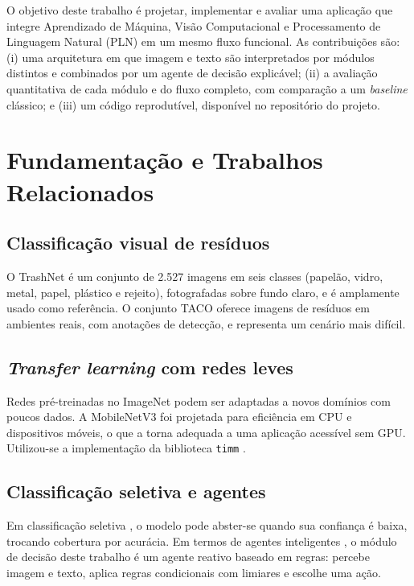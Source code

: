 \documentclass[conference]{IEEEtran}
\begin{document}
O objetivo deste trabalho \'e projetar, implementar e avaliar uma aplica\c{c}\~ao que integre Aprendizado de M\'aquina, Vis\~ao Computacional e Processamento de Linguagem Natural (PLN) em um mesmo fluxo funcional. As contribui\c{c}\~oes s\~ao: (i) uma arquitetura em que imagem e texto s\~ao interpretados por m\'odulos distintos e combinados por um agente de decis\~ao explic\'avel; (ii) a avalia\c{c}\~ao quantitativa de cada m\'odulo e do fluxo completo, com compara\c{c}\~ao a um \emph{baseline} cl\'assico; e (iii) um c\'odigo reprodut\'ivel, dispon\'ivel no reposit\'orio do projeto.

\section{Fundamenta\c{c}\~ao e Trabalhos Relacionados}
\subsection{Classifica\c{c}\~ao visual de res\'iduos}
O TrashNet \cite{yang2016trashnet} \'e um conjunto de 2.527 imagens em seis classes (papel\~ao, vidro, metal, papel, pl\'astico e rejeito), fotografadas sobre fundo claro, e \'e amplamente usado como refer\^encia. O conjunto TACO \cite{proenca2020taco} oferece imagens de res\'iduos em ambientes reais, com anota\c{c}\~oes de detec\c{c}\~ao, e representa um cen\'ario mais dif\'icil.

\subsection{\emph{Transfer learning} com redes leves}
Redes pr\'e-treinadas no ImageNet \cite{deng2009imagenet} podem ser adaptadas a novos dom\'inios com poucos dados. A MobileNetV3 \cite{howard2019mobilenetv3} foi projetada para eficiência em CPU e dispositivos m\'oveis, o que a torna adequada a uma aplica\c{c}\~ao acess\'ivel sem GPU. Utilizou-se a implementa\c{c}\~ao da biblioteca \texttt{timm} \cite{wightman2019timm}.

\subsection{Classifica\c{c}\~ao seletiva e agentes}
Em classifica\c{c}\~ao seletiva \cite{geifman2017selective}, o modelo pode abster-se quando sua confian\c{c}a \'e baixa, trocando cobertura por acur\'acia. Em termos de agentes inteligentes \cite{russell2020aima}, o m\'odulo de decis\~ao deste trabalho \'e um agente reativo baseado em regras: percebe imagem e texto, aplica regras condicionais com limiares e escolhe uma a\c{c}\~ao.
\end{document}
